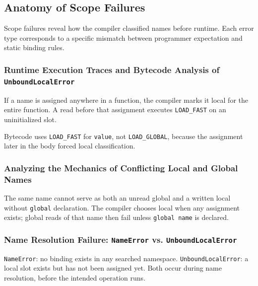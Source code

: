 \subsection{Anatomy of Scope Failures}

Scope failures reveal how the compiler classified names before runtime. Each error type corresponds to a specific mismatch between programmer expectation and static binding rules.

\subsubsection{Runtime Execution Traces and Bytecode Analysis of \texttt{UnboundLocalError}}

If a name is assigned anywhere in a function, the compiler marks it local for the entire function. A read before that assignment executes \texttt{LOAD\_FAST} on an uninitialized slot.



Bytecode uses \texttt{LOAD\_FAST} for \texttt{value}, not \texttt{LOAD\_GLOBAL}, because the assignment later in the body forced local classification.

\subsubsection{Analyzing the Mechanics of Conflicting Local and Global Names}

The same name cannot serve as both an unread global and a written local without \texttt{global} declaration. The compiler chooses local when any assignment exists; global reads of that name then fail unless \texttt{global name} is declared.

\subsubsection{Name Resolution Failure: \texttt{NameError} vs. \texttt{UnboundLocalError}}

\texttt{NameError}: no binding exists in any searched namespace. \texttt{UnboundLocalError}: a local slot exists but has not been assigned yet. Both occur during name resolution, before the intended operation runs.
